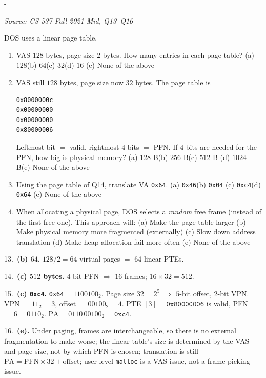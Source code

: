 \documentclass[11pt,a4paper]{article}
\makeatletter
\newcommand{\keepspace}[1]{\par\penalty-100\begingroup
  \setlength{\dimen@}{#1}\dimen@ii\pagegoal\advance\dimen@ii-\pagetotal
  \ifdim\dimen@>\dimen@ii\ifdim\dimen@ii>\z@\vfil\fi\break\fi\endgroup}
\newcounter{qn}[section]
\newenvironment{Qn}[4]{%
  \refstepcounter{qn}\keepspace{7\baselineskip}%
  \begin{tcolorbox}[qboxstyle, title={Q\thesection.\theqn\ \ [#1 \textbar\ #2]\ \ #4}]%
  {\footnotesize\color{g3}\textit{Source: #3}}\par\smallskip%
}{%
  \end{tcolorbox}%
}
\newenvironment{Sol}{%
  \begin{tcolorbox}[sboxstyle, title={Solution}]%
}{%
  \end{tcolorbox}\vspace{0.35em}%
}
\makeatother
\begin{document}
\begin{Qn}{Medium-Hard}{Lect 12}{CS-537 Fall 2021 Mid, Q13--Q16}{DOS paging: PTE count, physical size, and translate \texttt{0x64}}
DOS uses a linear page table.
\begin{enumerate}
  \item[13.] VAS $128$ bytes, page size $2$ bytes. How many entries
        in each page table?
        (a) $128$\quad (b) $64$\quad (c) $32$\quad (d) $16$\quad
        (e) None of the above
  \item[14.] VAS still $128$ bytes, page size now $32$ bytes. The
        page table is
\begin{lstlisting}[numbers=none]
0x8000000c
0x00000000
0x00000000
0x80000006
\end{lstlisting}
        Leftmost bit $=$ valid, rightmost $4$ bits $=$ PFN. If $4$
        bits are needed for the PFN, how big is physical memory?
        (a) $128$ B\quad (b) $256$ B\quad (c) $512$ B\quad
        (d) $1024$ B\quad (e) None of the above
  \item[15.] Using the page table of Q14, translate VA \texttt{0x64}.
        (a) \texttt{0x46}\quad (b) \texttt{0x04}\quad
        (c) \texttt{0xc4}\quad (d) \texttt{0x64}\quad
        (e) None of the above
  \item[16.] When allocating a physical page, DOS selects a
        \emph{random} free frame (instead of the first free one).
        This approach will:
        (a) Make the page table larger\quad
        (b) Make physical memory more fragmented (externally)\quad
        (c) Slow down address translation\quad
        (d) Make heap allocation fail more often\quad
        (e) None of the above
\end{enumerate}
\end{Qn}
\begin{Sol}
13.\ \textbf{(b) $64$.} $128/2=64$ virtual pages $=$ $64$ linear
PTEs.

14.\ \textbf{(c) $512$ bytes.} $4$-bit PFN $\Rightarrow$ $16$
frames; $16\times 32=512$.

15.\ \textbf{(c) \texttt{0xc4}.}
\texttt{0x64}$=1100100_2$. Page size $32=2^5$ $\Rightarrow$ $5$-bit
offset, $2$-bit VPN. VPN $=11_2=3$, offset $=00100_2=4$.
PTE $[3]=\texttt{0x80000006}$ is valid, PFN $=6=0110_2$.
$\mathrm{PA}=0110\,00100_2=\texttt{0xc4}$.

16.\ \textbf{(e).} Under paging, frames are interchangeable, so
there is no external fragmentation to make worse; the linear table's
size is determined by the VAS and page size, not by which PFN is
chosen; translation is still $\mathrm{PA}=\mathrm{PFN}\times 32+\mathrm{offset}$;
user-level \texttt{malloc} is a VAS issue, not a frame-picking issue.
\end{Sol}
\end{document}
